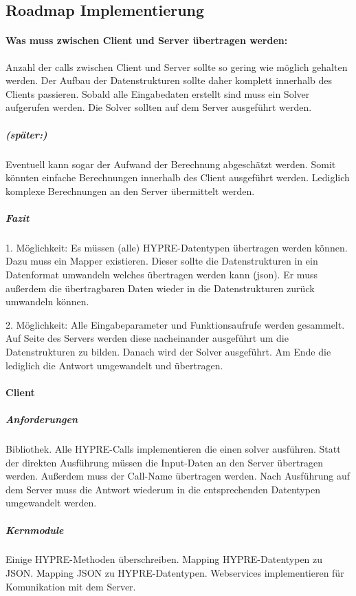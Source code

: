 \documentclass[a4paper,10pt]{article}
\begin{document}
\subsection{Roadmap Implementierung}

\paragraph{Was muss zwischen Client und Server übertragen werden:}

Anzahl der calls zwischen Client und Server sollte so gering wie möglich gehalten werden.
Der Aufbau der Datenstrukturen sollte daher komplett innerhalb des Clients passieren.
Sobald alle Eingabedaten erstellt sind muss ein Solver aufgerufen werden.
Die Solver sollten auf dem Server ausgeführt werden.

\subparagraph{(später:)}

Eventuell kann sogar der Aufwand der Berechnung abgeschätzt werden.
Somit könnten einfache Berechnungen innerhalb des Client ausgeführt werden.
Lediglich komplexe Berechnungen an den Server übermittelt werden.

\subparagraph{Fazit}

1. Möglichkeit:
Es müssen (alle) HYPRE-Datentypen übertragen werden können.
Dazu muss ein Mapper existieren.
Dieser sollte die Datenstrukturen in ein Datenformat umwandeln welches übertragen werden kann (json).
Er muss außerdem die übertragbaren Daten wieder in die Datenstrukturen zurück umwandeln können.

2. Möglichkeit:
Alle Eingabeparameter und Funktionsaufrufe werden gesammelt.
Auf Seite des Servers werden diese nacheinander ausgeführt um die Datenstrukturen zu bilden.
Danach wird der Solver ausgeführt.
Am Ende die lediglich die Antwort umgewandelt und übertragen.

\paragraph{Client}

\subparagraph{Anforderungen}

Bibliothek.
Alle HYPRE-Calls implementieren die einen solver ausführen.
Statt der direkten Ausführung müssen die Input-Daten an den Server übertragen werden.
Außerdem muss der Call-Name übertragen werden.
Nach Ausführung auf dem Server muss die Antwort wiederum in die entsprechenden Datentypen umgewandelt werden.

\subparagraph{Kernmodule}

Einige HYPRE-Methoden überschreiben.
Mapping HYPRE-Datentypen zu JSON.
Mapping JSON zu HYPRE-Datentypen.
Webservices implementieren für Komunikation mit dem Server.
\end{document}
